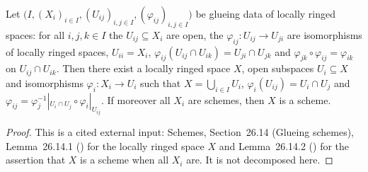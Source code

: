 \begin{lemma}
\label{lem:pc-glueing-schemes}
Let $\bigl(I,(X_i)_{i\in I},(U_{ij})_{i,j\in I},(\varphi_{ij})_{i,j\in I}\bigr)$ be glueing
data of locally ringed spaces: for all $i,j,k\in I$ the $U_{ij}\subseteq X_i$ are open, the
$\varphi_{ij}:U_{ij}\to U_{ji}$ are isomorphisms of locally ringed spaces, $U_{ii}=X_i$,
$\varphi_{ij}(U_{ij}\cap U_{ik})=U_{ji}\cap U_{jk}$ and
$\varphi_{jk}\circ\varphi_{ij}=\varphi_{ik}$ on $U_{ij}\cap U_{ik}$.  Then there exist a
locally ringed space $X$, open subspaces $U_i\subseteq X$ and isomorphisms
$\varphi_i:X_i\to U_i$ such that $X=\bigcup_{i\in I}U_i$,
$\varphi_i(U_{ij})=U_i\cap U_j$ and
$\varphi_{ij}=\varphi_j^{-1}|_{U_i\cap U_j}\circ\varphi_i|_{U_{ij}}$.  If moreover all $X_i$
are schemes, then $X$ is a scheme.
\mathlibok\ 
\end{lemma}
\begin{proof}
This is a cited external input: Schemes, Section~26.14 (Glueing schemes), Lemma~26.14.1
() for the locally ringed space $X$ and Lemma~26.14.2
() for the assertion that $X$ is a scheme when all $X_i$ are.  It is not
decomposed here.
\end{proof}

